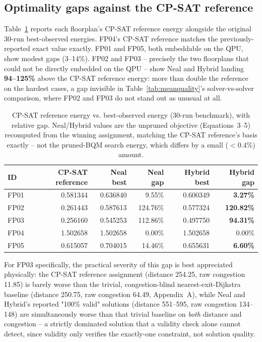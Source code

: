 \documentclass[11pt]{article}
\begin{document}
\subsection{Optimality gaps against the CP-SAT reference}
\label{sec:gaps}
Table~\ref{tab:milpgaps} reports each floorplan's CP-SAT reference energy alongside the original 30-run best-observed energies. FP04's CP-SAT reference matches the previously-reported exact value exactly. FP01 and FP05, both embeddable on the QPU, show modest gaps (3--14\%). FP02 and FP03 -- precisely the two floorplans that could not be directly embedded on the QPU -- show Neal and Hybrid landing \textbf{94--125\%} above the CP-SAT reference energy: more than double the reference on the hardest cases, a gap invisible in Table~\ref{tab:meanquality}'s solver-vs-solver comparison, where FP02 and FP03 do not stand out as unusual at all.

\begin{table}[h]
\centering
\caption{CP-SAT reference energy vs. best-observed energy (30-run benchmark), with relative gap. Neal/Hybrid values are the unpruned objective (Equations~3--5) recomputed from the winning assignment, matching the CP-SAT reference's basis exactly -- not the pruned-BQM search energy, which differs by a small ($<0.4\%$) amount.}
\label{tab:milpgaps}
\small
\begin{tabular}{lrrrrr}
\toprule
ID & CP-SAT reference & Neal best & Neal gap & Hybrid best & Hybrid gap \\
\midrule
FP01 & 0.581344 & 0.636840 & 9.55\% & 0.600349 & \textbf{3.27\%} \\
FP02 & 0.261443 & 0.587613 & 124.76\% & 0.577324 & \textbf{120.82\%} \\
FP03 & 0.256160 & 0.545253 & 112.86\% & 0.497750 & \textbf{94.31\%} \\
FP04 & 1.502658 & 1.502658 & 0.00\% & 1.502658 & 0.00\% \\
FP05 & 0.615057 & 0.704015 & 14.46\% & 0.655631 & \textbf{6.60\%} \\
\bottomrule
\end{tabular}
\end{table}

For FP03 specifically, the practical severity of this gap is best appreciated physically: the CP-SAT reference assignment (distance 254.25, raw congestion 11.85) is barely worse than the trivial, congestion-blind nearest-exit-Dijkstra baseline (distance 250.75, raw congestion 64.49, Appendix~A), while Neal and Hybrid's reported "100\% valid" solutions (distance 551--595, raw congestion 134--148) are simultaneously worse than that trivial baseline on \emph{both} distance and congestion -- a strictly dominated solution that a validity check alone cannot detect, since validity only verifies the exactly-one constraint, not solution quality.
\end{document}
